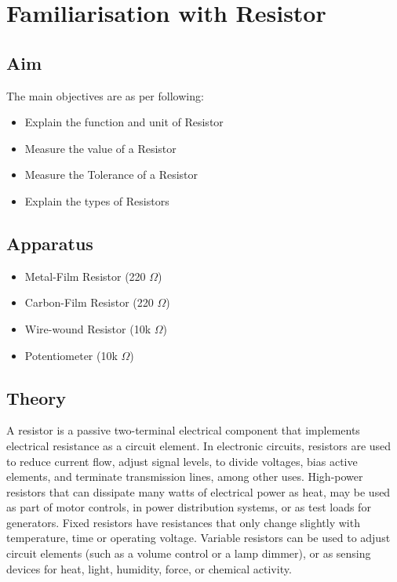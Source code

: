 \chapter{Familiarisation with Resistor}

\section{Aim}
	The main objectives are as per following:
	\begin{itemize}
		\tightlist
		\item Explain the function and unit of Resistor
		\item Measure the value of a Resistor
		\item Measure the Tolerance of a Resistor
		\item Explain the types of Resistors
	\end{itemize}

\section{Apparatus}
\begin{itemize}
	\tightlist
	\item Metal-Film Resistor (220 $\Omega$)
	\item Carbon-Film Resistor (220 $\Omega$)
	\item Wire-wound Resistor (10k $\Omega$)
	\item Potentiometer (10k $\Omega$)
\end{itemize}


\section{Theory}
	A resistor is a passive two-terminal electrical component that implements electrical resistance as a circuit element. In electronic circuits, resistors are used to reduce current flow, adjust signal levels, to divide voltages, bias active elements, and terminate transmission lines, among other uses. High-power resistors that can dissipate many watts of electrical power as heat, may be used as part of motor controls, in power distribution systems, or as test loads for generators. Fixed resistors have resistances that only change slightly with temperature, time or operating voltage. Variable resistors can be used to adjust circuit elements (such as a volume control or a lamp dimmer), or as sensing devices for heat, light, humidity, force, or chemical activity.
	
